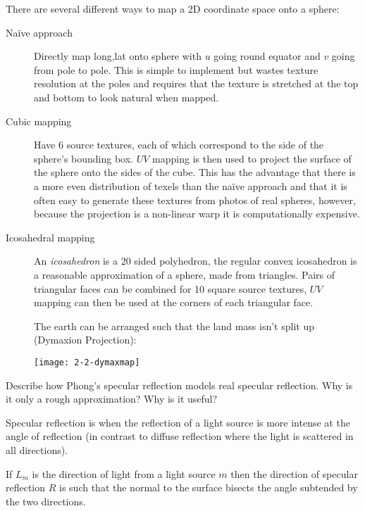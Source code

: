 \documentclass{supervision}
\begin{document}
\begin{questions}
\begin{solution}
    There are several different ways to map a 2D coordinate space onto a sphere:
    
    \begin{description}
        \item[Naïve approach]
        Directly map long,lat onto sphere with $u$ going round equator and $v$ going from pole to pole. This is simple to implement but wastes texture resolution at the poles and requires that the texture is stretched at the top and bottom to look natural when mapped.
        \item[Cubic mapping]
        Have 6 source textures, each of which correspond to the side of the sphere's bounding box. $UV$ mapping is then used to project the surface of the sphere onto the sides of the cube. This has the advantage that there is a more even distribution of texels than the naïve approach and that it is often easy to generate these textures from photos of real spheres, however, because the projection is a non-linear warp it is computationally expensive.
        \item[Icosahedral mapping]
        An \textit{icosahedron} is a 20 sided polyhedron, the regular convex icosahedron is a reasonable approximation of a sphere, made from triangles. Pairs of triangular faces can be combined for 10 square source textures, $UV$ mapping can then be used at the corners of each triangular face.
        
        The earth can be arranged such that the land mass isn't split up (Dymaxion Projection):
        
        \begin{center}
            \texttt{[image: 2-2-dymaxmap]}
        \end{center}
        
    \end{description}
    \end{solution}

    \question
    Describe how Phong's specular reflection models real specular reflection. Why is it only a rough approximation? Why is it useful?
    \begin{solution}
    Specular reflection is when the reflection of a light source is more intense at the angle of reflection (in contrast to diffuse reflection where the light is scattered in all directions).
    
    If $L_m$ is the direction of light from a light source $m$ then the direction of specular reflection $R$ is such that the normal to the surface bisects the angle subtended by the two directions.
    

\end{solution}
\end{questions}
\end{document}
